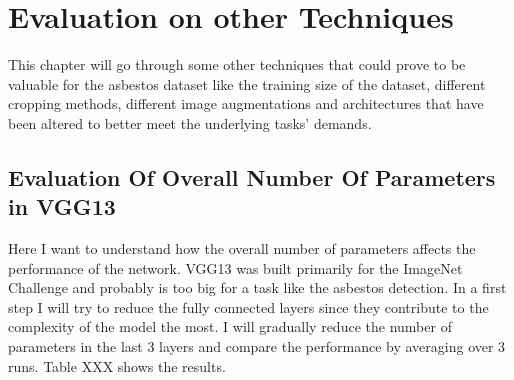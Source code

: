\chapter{Evaluation on other Techniques}

This chapter will go through some other techniques that could prove to be valuable for the asbestos dataset like the training size of the dataset, different cropping methods, different image augmentations and architectures that have been altered to better meet the underlying tasks' demands.

\section{Evaluation Of Overall Number Of Parameters in VGG13}

Here I want to understand how the overall number of parameters affects the performance of the network. VGG13 was built primarily for the ImageNet Challenge and probably is too big for a task like the asbestos detection. In a first step I will try to reduce the fully connected layers since they  contribute to the complexity of the model the most. I will gradually reduce the number of parameters in the last 3 layers and compare the performance by averaging over 3 runs. Table XXX shows the results.

